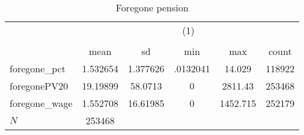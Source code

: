 \begin{table}[htbp]\centering
\def\sym#1{\ifmmode^{#1}\else\(^{#1}\)\fi}
\caption{Foregone pension}
\begin{tabular}{l*{1}{ccccc}}
\hline\hline
            &\multicolumn{5}{c}{(1)}                                         \\
            &\multicolumn{5}{c}{}                                            \\
            &        mean&          sd&         min&         max&       count\\
\hline
foregone\_pct&    1.532654&    1.377626&    .0132041&      14.029&      118922\\
foregonePV20&    19.19899&     58.0713&           0&     2811.43&      253468\\
foregone\_wage&    1.552708&    16.61985&           0&    1452.715&      252179\\
\hline
\(N\)       &      253468&            &            &            &            \\
\hline\hline
\end{tabular}
\end{table}
